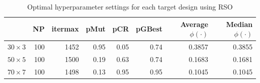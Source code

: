 \documentclass [PhD] {package/uclathes}
\begin{document}
\begin{table}

\caption{\label{tab:rso_optim}Optimal hyperparameter settings for each target design using RSO}
\centering
\begin{tabular}[t]{l|r|r|r|r|r|r|r}
\hline
  & NP & itermax & pMut & pCR & pGBest & Average $\phi(\cdot)$ & Median $\phi(\cdot)$\\
\hline
$30\times3$ & 100 & 1452 & 0.95 & 0.05 & 0.74 & 0.3857 & 0.3855\\
\hline
$50\times5$ & 100 & 1500 & 0.19 & 0.63 & 0.74 & 0.1683 & 0.1681\\
\hline
$70\times7$ & 100 & 1498 & 0.13 & 0.95 & 0.95 & 0.1045 & 0.1045\\
\hline
\end{tabular}
\end{table}
\end{document}
